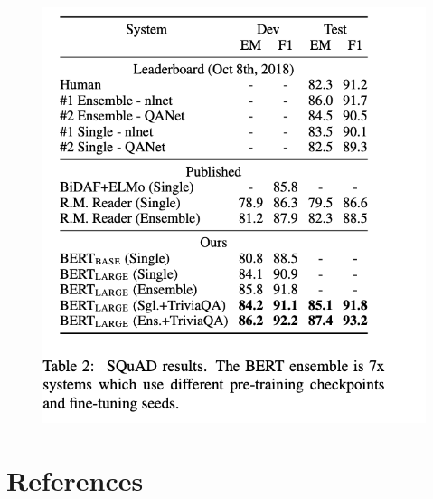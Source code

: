 \documentclass{article}
\begin{document}
\begin{figure}[!ht]
\centering
\includegraphics[scale=0.7]{../figures/BERT_SQuAD_results}
\label{fig:bert_squad_results}
\end{figure}

\section*{References}

{\small


}
\end{document}

